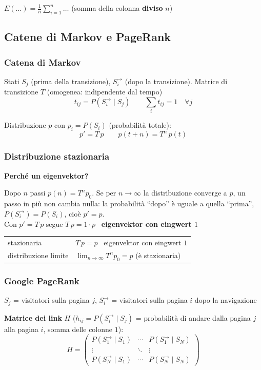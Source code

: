 \smallskip
{\small {} $E(\ldots) = \frac{1}{n} \sum_{i=1}^{n} \ldots$ \; (somma della colonna \textbf{diviso} $n$)}

\subsection{Catene di Markov e PageRank}

\subsubsection{Catena di Markov}

Stati $S_j$ (prima della transizione), $S_i^\to$ (dopo la transizione). Matrice di transizione $T$ (omogenea: indipendente dal tempo)
$$ \boxed{ t_{ij} = P(S_i^\to \mid S_j) } \qquad \sum_i t_{ij} = 1 \quad \forall j $$

Distribuzione $p$ con $p_i = P(S_i)$ (probabilità totale):
$$ \boxed{ p' = T \, p } \qquad \boxed{ p(t+n) = T^n \, p(t) } $$


\subsubsection{Distribuzione stazionaria}

\textbf{Perché un eigenvektor?} 

Dopo $n$ passi $p(n) = T^n p_0$. Se per $n \to \infty$ la distribuzione converge a $p$, un passo in più non cambia nulla: la probabilità ``dopo'' è uguale a quella ``prima'', $P(S_i^\to) = P(S_i)$, cioè $p' = p$. \\
Con $p' = T\,p$ segue $T\,p = 1 \cdot p$ \textrightarrow\ \textbf{eigenvektor con eingwert $1$}


\begin{tabular}{ll}
	stazionaria			& $T \, p = p$ \textrightarrow\ eigenvektor con eingwert $1$ \\
	distribuzione limite	& $\displaystyle \lim_{n \to \infty} T^n p_0 = p$ (è stazionaria)
\end{tabular}



\subsubsection{Google PageRank}

$S_j$ = visitatori sulla pagina $j$, $S_i^\to$ = visitatori sulla pagina $i$ dopo la navigazione

\textbf{Matrice dei link} $H$ \quad ($h_{ij} = P(S_i^\to \mid S_j)$ = probabilità di andare dalla pagina $j$ alla pagina $i$, somma delle colonne $1$):
$$ \boxed{ H = \begin{pmatrix}
	P(S_1^\to \mid S_1) & \cdots & P(S_1^\to \mid S_N) \\
	\vdots & \ddots & \vdots \\
	P(S_N^\to \mid S_1) & \cdots & P(S_N^\to \mid S_N)
\end{pmatrix} } $$


